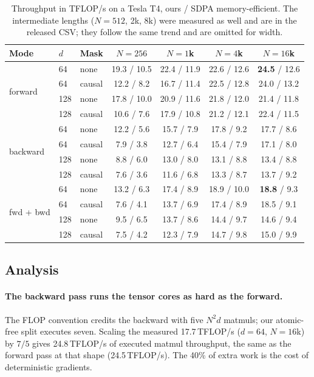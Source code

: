 \documentclass[10pt,twocolumn,letterpaper]{article}
\newcommand{\TF}{\,TFLOP/s}
\begin{document}
\begin{table}[t]
\centering
\footnotesize
\begin{tabular}{@{}lllcccc@{}}
\toprule
Mode & $d$ & Mask & $N=256$ & $N=1$k & $N=4$k & $N=16$k \\
\midrule
\multirow{4}{*}{forward}
 & 64 & none & 19.3 / 10.5 & 22.4 / 11.9 & 22.6 / 12.6 & \textbf{24.5} / 12.6 \\
 & 64 & causal & 12.2 / 8.2 & 16.7 / 11.4 & 22.5 / 12.8 & 24.0 / 13.2 \\
 & 128 & none & 17.8 / 10.0 & 20.9 / 11.6 & 21.8 / 12.0 & 21.4 / 11.8 \\
 & 128 & causal & 10.6 / 7.6 & 17.9 / 10.8 & 21.2 / 12.1 & 22.4 / 11.5 \\
\midrule
\multirow{4}{*}{backward}
 & 64 & none & 12.2 / 5.6 & 15.7 / 7.9 & 17.8 / 9.2 & 17.7 / 8.6 \\
 & 64 & causal & 7.9 / 3.8 & 12.7 / 6.4 & 15.4 / 7.9 & 17.1 / 8.0 \\
 & 128 & none & 8.8 / 6.0 & 13.0 / 8.0 & 13.1 / 8.8 & 13.4 / 8.8 \\
 & 128 & causal & 7.6 / 3.6 & 11.6 / 6.8 & 13.3 / 8.7 & 13.7 / 9.2 \\
\midrule
\multirow{4}{*}{fwd + bwd}
 & 64 & none & 13.2 / 6.3 & 17.4 / 8.9 & 18.9 / 10.0 & \textbf{18.8} / 9.3 \\
 & 64 & causal & 7.6 / 4.1 & 13.7 / 6.9 & 17.4 / 8.9 & 18.5 / 9.1 \\
 & 128 & none & 9.5 / 6.5 & 13.7 / 8.6 & 14.4 / 9.7 & 14.6 / 9.4 \\
 & 128 & causal & 7.5 / 4.2 & 12.3 / 7.9 & 14.7 / 9.8 & 15.0 / 9.9 \\
\bottomrule
\end{tabular}
\caption{Throughput in TFLOP/s on a Tesla T4, ours / SDPA memory-efficient.
The intermediate lengths ($N = 512$, 2k, 8k) were measured as well and are
in the released CSV; they follow the same trend and are omitted for width.}
\label{tab:main}
\end{table}

\subsection{Analysis}

\paragraph{The backward pass runs the tensor cores as hard as the forward.}
The FLOP convention credits the backward with five $N^2 d$ matmuls; our
atomic-free split executes seven. Scaling the measured 17.7\TF{} ($d = 64$,
$N = 16$k) by $7/5$ gives 24.8\TF{} of executed matmul throughput, the same as
the forward pass at that shape (24.5\TF{}). The 40\% of extra work is the cost
of deterministic gradients.
\end{document}

